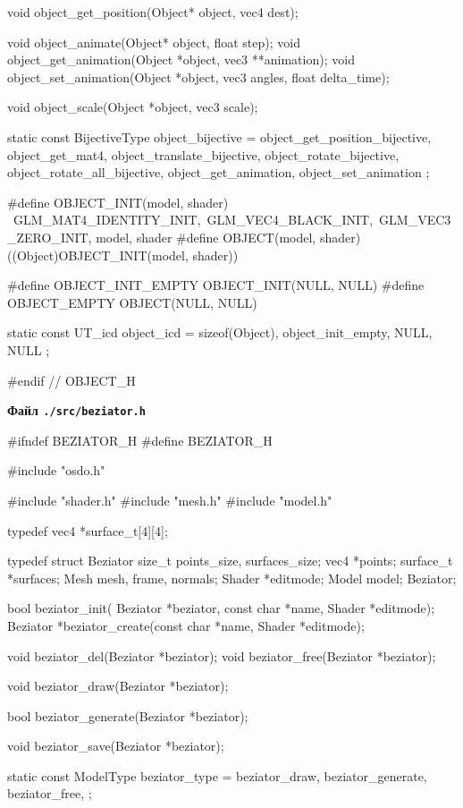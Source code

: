 \documentclass[14pt,a4paper]{extarticle}
\theoremstyle{definition}
\renewcommand{\[}{\begin{singlespace}\begin{equation*}}
\renewcommand{\]}{\end{equation*}\end{singlespace}}
\begin{document}
\begin{multicols}{2}
\begin{ccode}
void object_get_position(Object* object, vec4 dest);

void object_animate(Object* object, float step);
void object_get_animation(Object *object, vec3 **animation);
void object_set_animation(Object *object, vec3 angles, float delta_time);

void object_scale(Object *object, vec3 scale);

static const BijectiveType object_bijective = {
    object_get_position_bijective,
    object_get_mat4,
    object_translate_bijective,
    object_rotate_bijective,
    object_rotate_all_bijective,
    object_get_animation,
    object_set_animation
};

#define OBJECT_INIT(model, shader) {\
    GLM_MAT4_IDENTITY_INIT,\
    GLM_VEC4_BLACK_INIT,\
    GLM_VEC3_ZERO_INIT, model, shader}
#define OBJECT(model, shader) ((Object)OBJECT_INIT(model, shader))

#define OBJECT_INIT_EMPTY OBJECT_INIT(NULL, NULL)
#define OBJECT_EMPTY OBJECT(NULL, NULL)

static const UT_icd object_icd = {
    sizeof(Object), object_init_empty, NULL, NULL
};

#endif // OBJECT_H
\end{ccode}
\noindent\cprotect\textbf{Файл \verb+./src/beziator.h+}
\begin{ccode}
#ifndef BEZIATOR_H
#define BEZIATOR_H

#include "osdo.h"

#include "shader.h"
#include "mesh.h"
#include "model.h"

typedef vec4 *surface_t[4][4];

typedef struct Beziator {
    size_t points_size, surfaces_size;
    vec4 *points;
    surface_t *surfaces;
    Mesh mesh, frame, normals;
    Shader *editmode;
    Model model;
} Beziator;

bool beziator_init(
        Beziator *beziator, const char *name, Shader *editmode);
Beziator *beziator_create(const char *name, Shader *editmode);

void beziator_del(Beziator *beziator);
void beziator_free(Beziator *beziator);

void beziator_draw(Beziator *beziator);

bool beziator_generate(Beziator *beziator);

void beziator_save(Beziator *beziator);

static const ModelType beziator_type = {
    beziator_draw, beziator_generate, beziator_free,
};


\end{ccode}
\end{multicols}
\end{document}
